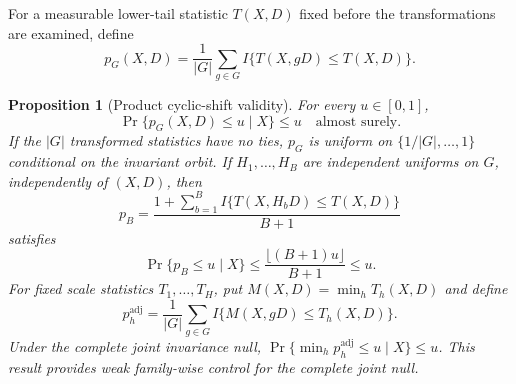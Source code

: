 \documentclass[namedate,webpdf,modern,mediumone]{oup-authoring-template}
\theoremstyle{thmstyleone}
\newtheorem{proposition}{Proposition}
\begin{document}
For a measurable lower-tail statistic $T(X,D)$ fixed before the
transformations are examined, define
\[
 p_G(X,D)=\frac{1}{|G|}\sum_{g\in G}
 I\{T(X,gD)\leq T(X,D)\}.
\]

\begin{proposition}[Product cyclic-shift validity]
\label{prop:product-shift}
For every $u\in[0,1]$,
\[
 \Pr\{p_G(X,D)\leq u\mid X\}\leq u\quad\text{almost surely}.
\]
If the $|G|$ transformed statistics have no ties, $p_G$ is uniform on
$\{1/|G|,\ldots,1\}$ conditional on the invariant orbit. If
$H_1,\ldots,H_B$ are independent uniforms on $G$, independently of $(X,D)$,
then
\[
 p_B=\frac{1+\sum_{b=1}^B
 I\{T(X,H_bD)\leq T(X,D)\}}{B+1}
\]
satisfies
\[
 \Pr\{p_B\leq u\mid X\}
 \leq\frac{\lfloor(B+1)u\rfloor}{B+1}\leq u.
\]
For fixed scale statistics $T_1,\ldots,T_H$, put
$M(X,D)=\min_hT_h(X,D)$ and define
\[
 p_h^{\mathrm{adj}}=\frac{1}{|G|}\sum_{g\in G}
 I\{M(X,gD)\leq T_h(X,D)\}.
\]
Under the complete joint invariance null,
$\Pr\{\min_h p_h^{\mathrm{adj}}\leq u\mid X\}\leq u$.
This result provides weak family-wise control for the complete joint null.
\end{proposition}
\end{document}
